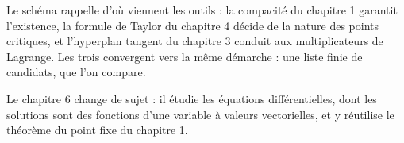 \documentclass[a4paper,twoside]{report}
\begin{document}
\noindent Le schéma rappelle d'où viennent les outils : la compacité du chapitre 1 garantit l'existence, la formule de Taylor du chapitre 4 décide de la nature des points critiques, et l'hyperplan tangent du chapitre 3 conduit aux multiplicateurs de Lagrange. Les trois convergent vers la même démarche : une liste finie de candidats, que l'on compare.

\noindent Le chapitre 6 change de sujet : il étudie les équations différentielles, dont les solutions sont des fonctions d'une variable à valeurs vectorielles, et y réutilise le théorème du point fixe du chapitre 1.
\end{document}
